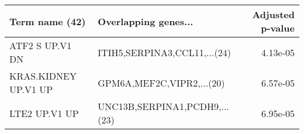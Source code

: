\begin{tabular}{llr}
\toprule
      Term name (42) &          Overlapping genes... &  Adjusted p-value \\
\midrule
     ATF2 S UP.V1 DN &  ITIH5,SERPINA3,CCL11,...(24) &          4.13e-05 \\
KRAS.KIDNEY UP.V1 UP &     GPM6A,MEF2C,VIPR2,...(20) &          6.57e-05 \\
       LTE2 UP.V1 UP & UNC13B,SERPINA1,PCDH9,...(23) &          6.95e-05 \\
\bottomrule
\end{tabular}
